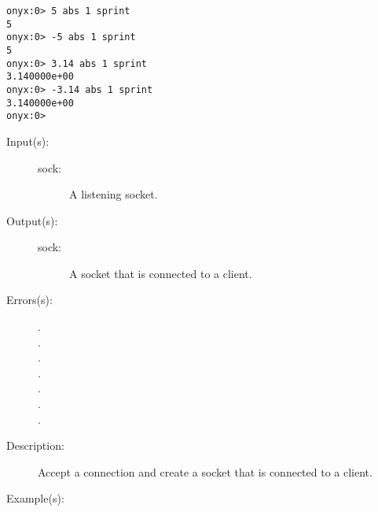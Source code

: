 \begin{description}
\begin{description}
\begin{verbatim}
onyx:0> 5 abs 1 sprint
5
onyx:0> -5 abs 1 sprint
5
onyx:0> 3.14 abs 1 sprint
3.140000e+00
onyx:0> -3.14 abs 1 sprint
3.140000e+00
onyx:0>
		\end{verbatim}
	\end{description}
\label{systemdict:accept}
\item[{\onyxop{sock}{accept}{sock}}: ]
	\begin{description}\item[]
	\item[Input(s): ]
		\begin{description}\item[]
		\item[sock: ]
			A listening socket.
		\end{description}
	\item[Output(s): ]
		\begin{description}\item[]
		\item[sock: ]
			A socket that is connected to a client.
		\end{description}
	\item[Errors(s): ]
		\begin{description}\item[]
		\item[.]
		\item[.]
		\item[.]
		\item[.]
		\item[.]
		\item[.]
		\item[.]
		\end{description}
	\item[Description: ]
		Accept a connection and create a socket that is connected to a
		client.
	\item[Example(s): ]\begin{verbatim}


\end{verbatim}
\end{description}
\end{description}
